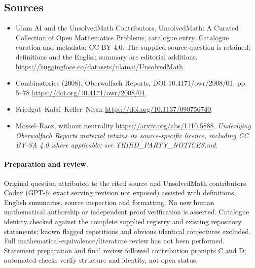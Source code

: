 \documentclass[11pt]{article}
\begin{document}
\subsection{Sources}
\begin{itemize}
\item[\hypertarget{source:statement:1}{S1}] Ulam AI and the UnsolvedMath Contributors, UnsolvedMath: A Curated Collection of Open Mathematics Problems, catalogue entry. Catalogue curation and metadata: CC BY 4.0. The supplied source question is retained; definitions and the English summary are editorial additions.
\url{https://huggingface.co/datasets/ulamai/UnsolvedMath}.
\item[\hypertarget{source:statement:2}{S2}] Combinatorics (2008), Oberwolfach Reports, DOI 10.4171/owr/2008/01, pp. 5--78
\url{https://doi.org/10.4171/owr/2008/01}.
\item[\hypertarget{source:statement:3}{S3}] Friedgut--Kalai--Keller--Nisan
\url{https://doi.org/10.1137/090756740}.
\item[\hypertarget{source:statement:4}{S4}] Mossel--Racz, without neutrality
\url{https://arxiv.org/abs/1110.5888}.
\textit{Underlying Oberwolfach Reports material retains its source-specific licence, including CC BY-SA 4.0 where applicable; see THIRD\_PARTY\_NOTICES.md.}
\end{itemize}
\paragraph{Preparation and review.}
Original question attributed to the cited source and UnsolvedMath contributors. Codex (GPT-6; exact serving revision not exposed) assisted with definitions, English summaries, source inspection and formatting. No new human mathematical authorship or independent proof verification is asserted. Catalogue identity checked against the complete supplied registry and existing repository statements; known flagged repetitions and obvious identical conjectures excluded. Full mathematical-equivalence/literature review has not been performed. Statement preparation and final review followed contribution prompts C and D; automated checks verify structure and identity, not open status.
\label{end:statement}
\end{document}
